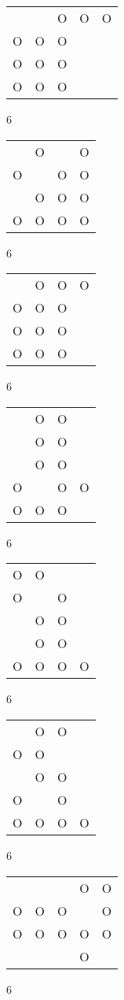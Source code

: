 \begin{tabular}{|m{0.2cm}m{0.2cm}m{0.2cm}m{0.2cm}m{0.2cm}|}\hline
 & &O&O&O\\
O&O&O& & \\
O&O&O& & \\
O&O&O& & \\
\hline\end{tabular}6
\begin{tabular}{|m{0.2cm}m{0.2cm}m{0.2cm}m{0.2cm}|}\hline
 &O& &O\\
O& &O&O\\
 &O&O&O\\
O&O&O&O\\
\hline\end{tabular}6
\begin{tabular}{|m{0.2cm}m{0.2cm}m{0.2cm}m{0.2cm}|}\hline
 &O&O&O\\
O&O&O& \\
O&O&O& \\
O&O&O& \\
\hline\end{tabular}6
\begin{tabular}{|m{0.2cm}m{0.2cm}m{0.2cm}m{0.2cm}|}\hline
 &O&O& \\
 &O&O& \\
 &O&O& \\
O& &O&O\\
O&O&O& \\
\hline\end{tabular}6
\begin{tabular}{|m{0.2cm}m{0.2cm}m{0.2cm}m{0.2cm}|}\hline
O&O& & \\
O& &O& \\
 &O&O& \\
 &O&O& \\
O&O&O&O\\
\hline\end{tabular}6
\begin{tabular}{|m{0.2cm}m{0.2cm}m{0.2cm}m{0.2cm}|}\hline
 &O&O& \\
O&O& & \\
 &O&O& \\
O& &O& \\
O&O&O&O\\
\hline\end{tabular}6
\begin{tabular}{|m{0.2cm}m{0.2cm}m{0.2cm}m{0.2cm}m{0.2cm}|}\hline
 & & &O&O\\
O&O&O& &O\\
O&O&O&O&O\\
 & & &O& \\
\hline\end{tabular}6
